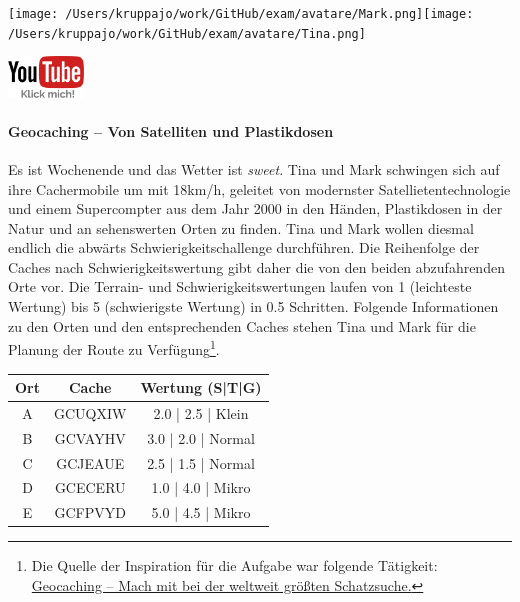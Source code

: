 \documentclass[a4paper, 9pt]{scrartcl}\usepackage[]{graphicx}\usepackage[]{xcolor}
\begin{document}
 
\ifcollection
\begin{flushright}
\tiny\vspace{-3Ex}
\textbf{\examinhaltstart}
\exammodulemathstat
\vspace{-4Ex}
\end{flushright}
\begin{minipage}[t]{0.5\textwidth}
\texttt{[image: /Users/kruppajo/work/GitHub/exam/avatare/Mark.png]}\hspace{-4mm}\texttt{[image: /Users/kruppajo/work/GitHub/exam/avatare/Tina.png]}
\end{minipage}
\begin{minipage}[t]{0.5\textwidth}
\hfill
\href{https://youtu.be/3LAq3R0rS14}{\includegraphics[width = 2cm]{img/youtube}}
\end{minipage}
\fi



\ifcollection
\paragraph{Geocaching -- Von Satelliten und Plastikdosen}
\fi



Es ist Wochenende und das Wetter ist \textit{sweet}. Tina und Mark schwingen sich auf ihre Cachermobile um mit 18km/h, geleitet von modernster Satellietentechnologie und einem Supercompter aus dem Jahr 2000 in den Händen, Plastikdosen in der Natur und an sehenswerten Orten zu finden. Tina und Mark wollen diesmal endlich die abwärts Schwierigkeitschallenge durchführen. Die Reihenfolge der Caches nach Schwierigkeitswertung gibt daher die von den beiden abzufahrenden Orte vor. Die Terrain- und Schwierigkeitswertungen laufen von 1 (leichteste Wertung) bis 5 (schwierigste Wertung) in 0.5 Schritten. Folgende Informationen zu den Orten und den entsprechenden Caches stehen Tina und Mark für die Planung der Route zu Verfügung\footnote{Die Quelle der Inspiration für die Aufgabe war folgende Tätigkeit: \href{https://www.geocaching.com/play}{Geocaching -- Mach mit bei der weltweit größten Schatzsuche.}}.

\begin{center}
  \begin{tabular}{ ccc }
    \toprule
    Ort & Cache & Wertung (S|T|G) \\
    \midrule
    A & GCUQXIW & 2.0 | 2.5 | Klein \\
    B & GCVAYHV & 3.0 | 2.0 | Normal \\ 
    C & GCJEAUE & 2.5 | 1.5 | Normal \\ 
    D & GCECERU & 1.0 | 4.0 | Mikro \\ 
    E & GCFPVYD & 5.0 | 4.5 | Mikro \\     
 \bottomrule
\end{tabular}
\end{center}
\end{document}
